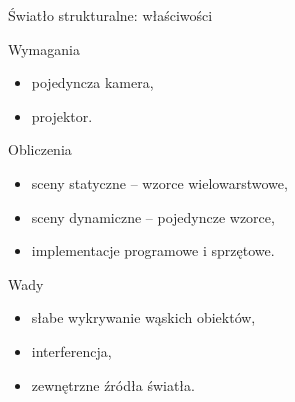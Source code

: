 \documentclass[xcolor=x11names,compress]{beamer}
\renewcommand{\(}{\begin{columns}}
\renewcommand{\)}{\end{columns}}
\newcommand{\<}[1]{\begin{column}{#1}}
\renewcommand{\>}{\end{column}}
\begin{document}
\begin{frame}{Światło strukturalne: właściwości}

    \vspace{.3cm}
    \alert{Wymagania}
    \begin{itemize}
    \item pojedyncza kamera,
    \item projektor.
    \end{itemize}

    \pause
    \vspace{.2cm}

    \alert{Obliczenia}
    \begin{itemize}
    \item sceny statyczne -- wzorce wielowarstwowe,
    \item sceny dynamiczne -- pojedyncze wzorce,
    \item implementacje programowe i sprzętowe.
    \end{itemize}

    \pause
    \vspace{.2cm}

    \alert{Wady}
    \begin{itemize}
    \item słabe wykrywanie wąskich obiektów,
    \item interferencja,
    \item zewnętrzne źródła światła.
    \end{itemize}

\end{frame}
\end{document}

